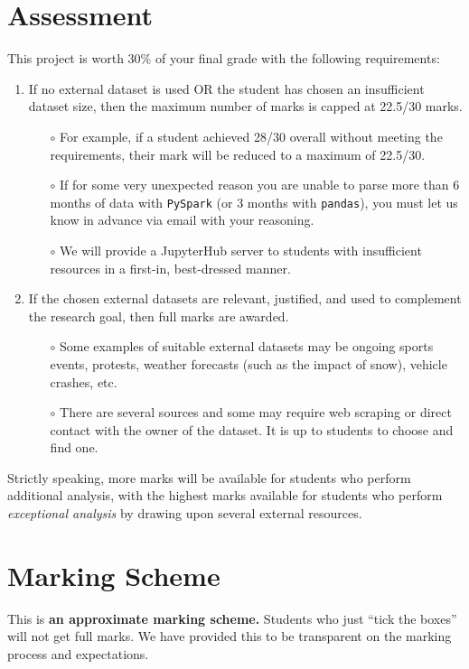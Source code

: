 \documentclass[12pt]{article}
\begin{document}
\section*{Assessment}
This project is worth 30\% of your final grade with the following requirements:
\begin{enumerate}
    \item If no external dataset is used OR the student has chosen an insufficient dataset size, then the maximum number of marks is capped at 22.5/30 marks. 
    \begin{itemize}
        \item[$\circ$] For example, if a student achieved 28/30 overall without meeting the requirements, their mark will be reduced to a maximum of 22.5/30.
        \item[$\circ$] If for some very unexpected reason you are unable to parse more than 6 months of data with \texttt{PySpark} (or 3 months with \texttt{pandas}), you must let us know in advance via email with your reasoning. 
        \item[$\circ$] We will provide a JupyterHub server to students with insufficient resources in a first-in, best-dressed manner. 
    \end{itemize} 
    \item If the chosen external datasets are relevant, justified, and used to complement the research goal, then full marks are awarded. 
    \begin{itemize}
        \item[$\circ$] Some examples of suitable external datasets may be ongoing sports events, protests, weather forecasts (such as the impact of snow), vehicle crashes, etc.
        \item[$\circ$] There are several sources and some may require web scraping or direct contact with the owner of the dataset. It is up to students to choose and find one.
    \end{itemize} 
     
\end{enumerate}
Strictly speaking, more marks will be available for students who perform additional analysis, with the highest marks available for students who perform \textit{exceptional analysis} by drawing upon several external resources.

\section*{Marking Scheme}
This is \textbf{an approximate marking scheme.} Students who just ``tick the boxes'' will not get full marks. We have provided this to be transparent on the marking process and expectations.
\end{document}
